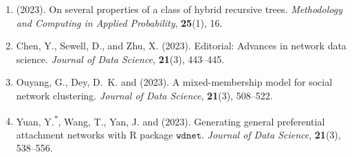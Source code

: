 \begin{enumerate}[resume=journalpubs]

\item\begin{pubentry} \PZ{} (2023). On several properties of a class of hybrid recursive trees. \emph{Methodology and Computing in Applied Probability}, \textbf{25}(1), 16.

\par\end{pubentry}
\item\begin{pubentry} Chen, Y., Sewell, D., \PZ{} and Zhu, X. (2023). Editorial: Advances in network data science. \emph{Journal of Data Science}, \textbf{21}(3), 443--445.

\par\end{pubentry}
\item\begin{pubentry} Ouyang, G., Dey, D.\ K. and \PZ{} (2023). A mixed-membership model for social network clustering. \emph{Journal of Data Science}, \textbf{21}(3), 508--522.

\par\end{pubentry}
\item\begin{pubentry} Yuan, Y.\textsuperscript{*}, Wang, T., Yan, J. and \PZnot{} (2023). Generating general preferential attachment networks with R package $\mathtt{wdnet}$. \emph{Journal of Data Science}, \textbf{21}(3), 538--556.
\par\end{pubentry}
\end{enumerate}
